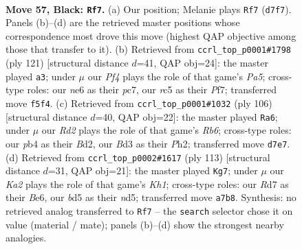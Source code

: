 \documentclass[11pt]{article}
\begin{document}
\clearpage

\begin{figure}[p]\centering
\begin{subfigure}{0.46\textwidth}\centering
\resizebox{\linewidth}{!}{%
\newchessgame
\chessboard[
  setfen={8/k2r4/4N3/2RB1p2/1P6/1K1b2N1/6P1/8 b - - 11 57},
  showmover=false,
  pgfstyle=straightmove, color=movearrow, markmove={d7-f7}
]}
\caption{}
\end{subfigure}\hfill
\begin{subfigure}{0.46\textwidth}\centering
\resizebox{\linewidth}{!}{%
\newchessgame
\chessboard[
  setfen={8/2P2p2/1r1Bb1k1/8/p2R4/2K3P1/8/8 b - - 1 61},
  showmover=false,
  pgfstyle=straightmove, color=movearrow, markmove={a4-a3}
]}
\caption{}
\end{subfigure}
\\[4pt]
\begin{subfigure}{0.46\textwidth}\centering
\resizebox{\linewidth}{!}{%
\newchessgame
\chessboard[
  setfen={8/5k2/1R2bp2/7n/5Pp1/8/3B1K1P/8 w - - 4 54},
  showmover=false,
  pgfstyle=straightmove, color=movearrow, markmove={b6-a6}
]}
\caption{}
\end{subfigure}\hfill
\begin{subfigure}{0.46\textwidth}\centering
\resizebox{\linewidth}{!}{%
\newchessgame
\chessboard[
  setfen={3r3k/8/4b3/3N3n/2B1P1p1/1PK5/8/R7 b - - 3 57},
  showmover=false,
  pgfstyle=straightmove, color=movearrow, markmove={h8-g7}
]}
\caption{}
\end{subfigure}
\caption{\textbf{Move 57, Black: \texttt{Rf7}.} (a) Our position; Melanie plays \texttt{Rf7} (\texttt{d7f7}). Panels (b)--(d) are the retrieved master positions whose correspondence most drove this move (highest QAP objective among those that transfer to it). (b) Retrieved from \texttt{ccrl\_top\_p0001\#1798} (ply 121) [structural distance $d$=41, QAP obj=24]: the master played \texttt{a3}; under $\mu$ our \emph{Pf4} plays the role of that game's \emph{Pa5}; cross-type roles: our \emph{n}e6 as their \emph{p}c7, our \emph{r}c5 as their \emph{P}f7; transferred move \texttt{f5f4}. (c) Retrieved from \texttt{ccrl\_top\_p0001\#1032} (ply 106) [structural distance $d$=40, QAP obj=22]: the master played \texttt{Ra6}; under $\mu$ our \emph{Rd2} plays the role of that game's \emph{Rb6}; cross-type roles: our \emph{p}b4 as their \emph{B}d2, our \emph{B}d3 as their \emph{P}h2; transferred move \texttt{d7e7}. (d) Retrieved from \texttt{ccrl\_top\_p0002\#1617} (ply 113) [structural distance $d$=31, QAP obj=21]: the master played \texttt{Kg7}; under $\mu$ our \emph{Ka2} plays the role of that game's \emph{Kh1}; cross-type roles: our \emph{R}d7 as their \emph{B}e6, our \emph{b}d5 as their \emph{n}d5; transferred move \texttt{a7b8}. Synthesis: no retrieved analog transferred to \texttt{Rf7} -- the \texttt{search} selector chose it on value (material / mate); panels (b)--(d) show the strongest nearby analogies.}
\label{fig:thought-m113}
\end{figure}
\end{document}
